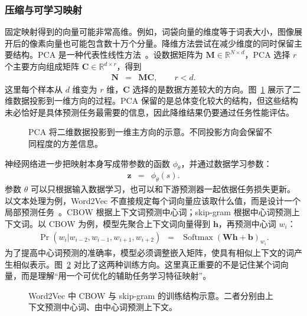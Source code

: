 \subsubsection{压缩与可学习映射}

固定映射得到的向量可能非常高维。例如，词袋向量的维度等于词表大小，图像展开后的像素向量也可能包含数十万个分量。降维方法尝试在减少维度的同时保留主要结构。PCA 是一种代表性线性方法~\cite{Jolliffe2002PCA}。设数据矩阵为 $\mathbf{M}\in\mathbb{R}^{N\times d}$，PCA 选择 $r$ 个主要方向组成矩阵 $\mathbf{C}\in\mathbb{R}^{d\times r}$，得到
\begin{eqnarray}
\mathbf{N}
& = &
\mathbf{M}\mathbf{C},
\qquad r<d.
\end{eqnarray}
这里每个样本从 $d$ 维变为 $r$ 维，$\mathbf{C}$ 选择的是数据方差较大的方向。图~\ref{fig:nlpbook-pca-2d-to-1d} 展示了二维数据投影到一维方向的过程。PCA 保留的是总体变化较大的结构，但这些结构未必恰好是具体预测任务最需要的信息，因此降维结果仍要通过任务性能评估。

\begin{figure}[htbp]
  \centering
  
  \caption{PCA 将二维数据投影到一维主方向的示意。不同投影方向会保留不同程度的方差信息。}
  \label{fig:nlpbook-pca-2d-to-1d}
\end{figure}

神经网络进一步把映射本身写成带参数的函数 $\phi_{\theta}$，并通过数据学习参数：
\begin{eqnarray}
\mathbf{z} &=& \phi_{\theta}(s).
\end{eqnarray}
参数 $\theta$ 可以只根据输入数据学习，也可以和下游预测器一起依据任务损失更新。以文本处理为例，Word2Vec 不直接规定每个词向量应该取什么值，而是设计一个局部预测任务~\cite{MikolovEtAl2013Word2Vec}。CBOW 根据上下文词预测中心词；skip-gram 根据中心词预测上下文词。以 CBOW 为例，模型先聚合上下文词向量得到 $\mathbf{h}$，再预测中心词 $w_i$：
\begin{eqnarray}
\Pr(w_i|w_{i-2},w_{i-1},w_{i+1},w_{i+2})
& = &
\operatorname{Softmax}(\mathbf{W}\mathbf{h}+\mathbf{b})_{w_i}.
\end{eqnarray}
为了提高中心词预测的准确率，模型必须调整嵌入矩阵，使具有相似上下文的词产生相似表示。图~\ref{fig:nlpbook-cbow-skipgram} 对比了这两种训练方向。这里真正重要的不是记住某个词向量，而是理解“用一个可优化的辅助任务学习特征映射”。

\begin{figure}[htbp]
  \centering
  
  \caption{Word2Vec 中 CBOW 与 skip-gram 的训练结构示意。二者分别由上下文预测中心词、由中心词预测上下文。}
  \label{fig:nlpbook-cbow-skipgram}
\end{figure}

